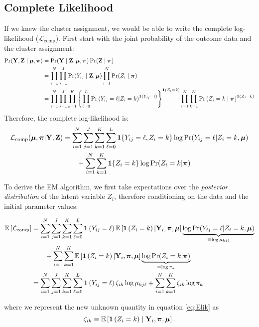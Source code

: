 \documentclass[11pt]{article}
\begin{document}
\subsection{Complete Likelihood} If we knew the cluster assignment, we would be able to write the complete log-likelihood (\(\mathcal{L}_{\text{comp}}\)). First start with the joint probability of the outcome data and the cluster assignment:
\begin{align}
\Pr(\mathbf{Y}, \mathbf{Z} \mid \bm{\mu}, \bm{\pi}) &= \Pr(\mathbf{Y} \mid \mathbf{Z}, \bm{\mu}, \bm{\pi})\Pr(\mathbf{Z} \mid \bm{\pi})\nonumber\\
&= \prod^{N}_{i=1}\prod^{J}_{j=1}\Pr(Y_{ij} \mid \mathbf{Z}, \bm{\mu}) \prod^N_{i=1}\Pr(Z_i \mid \bm{\pi})\nonumber\\
&= \prod^{N}_{i=1}\prod^{J}_{j=1}\prod^{K}_{k=1}\left\{\prod^{L}_{\ell=0}\mathbb{\Pr}\left(Y_{ij} = \ell | Z_i = k\right)^{\bm{1}\left(Y_{ij} = \ell\right)}\right\}^{\bm{1}\left(Z_i=k\right)} \prod^N_{i=1}\prod^K_{k=1}\mathbb{\Pr}\left(Z_i = {k} \mid \bm{\pi}\right)^{\bm{1}\left(Z_i = k\right)}\nonumber
\end{align}
Therefore, the complete log-likelihood is:
\begin{align}
\mathcal{L}_{\text{comp}}(\bm{\mu}, \bm{\pi}|\mathbf{Y}, \mathbf{Z})
& = \sum^{N}_{i=1}\sum^{J}_{j=1}\sum^{K}_{k=1}\sum^{L}_{\ell = 0}
\bm{1}\{Y_{ij} = \ell, Z_{i} = k\}
\log \Pr(Y_{ij} = \ell | Z_{i} = k, \bm{\mu})\nonumber\\
& \qquad +
\sum^N_{i=1}\sum^{K}_{k=1}\bm{1}\{Z_{i} = k\}\log \Pr(Z_{i} = k | \bm{\pi}) \label{eq:complik}
\end{align}

To derive the EM algorithm, we first take expectations over the \emph{posterior distribution} of the latent variable $Z_{i}$, therefore conditioning on the data and the initial parameter values:

\begin{align}
\mathbb{E}\left[\mathcal{L}_{\text{comp}}\right]
& = \sum^{N}_{i=1}\sum^{J}_{j=1}\sum^{K}_{k=1}\sum^{L}_{\ell = 0}
\bm{1}\left(Y_{ij} = \ell\right) \mathbb{E}\left[\bm{1}\left(Z_{i} = k\right)| \mathbf{Y}_i, \bm{\pi}, \bm{\mu}\right]
\underbrace{\log \Pr(Y_{ij} = \ell | Z_{i} = k, \bm{\mu})}_{\equiv \log{\mu}_{kj\ell}}
\nonumber\\
& \qquad +
\sum^{N}_{i=1}\sum^{K}_{k=1}\mathbb{E}\left[\bm{1}\left(Z_{i} = k\right) | \mathbf{Y}_i, \bm{\pi}, \bm{\mu}\right]\underbrace{\log \Pr(Z_{i} = k | \bm{\pi})}_{= \log {\pi}_{k}} \label{eq:Elik}\\
& = \sum^{N}_{i=1}\sum^{J}_{j=1}\sum^{K}_{k=1}\sum^{L}_{\ell = 0}\bm{1}\left(Y_{ij} = \ell\right)\zeta_{ik}\log \mu_{kj\ell}
\nonumber + \sum^{N}_{i=1}\sum^{K}_{k=1}\zeta_{ik}\log\pi_k
\end{align}

where we represent the new unknown quantity in equation \ref{eq:Elik} as
\[\zeta_{ik} \equiv \mathbb{E}\left[\bm{1}\left(Z_i = k\right) \mid \mathbf{Y}_i, \bm{\pi}, \bm{\mu}\right].\]
\end{document}
